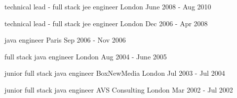 



\begin{cventries}

    \cventry
    {technical lead - full stack jee engineer}
    {}
    {London}
    {June 2008 - Aug 2010}
    {}
    {}

    \cventry
    {technical lead - full stack jee engineer}
    {}
    {London}
    {Dec 2006 - Apr 2008}
    {}
    {}

    \cventry
    {java engineer}
    {}
    {Paris}
    {Sep 2006 - Nov 2006}
    {}
    {}

    \cventry
    {full stack java engineer}
    {}
    {London}
    {Aug 2004 - June 2005}
    {}
    {}

    \cventry
    {junior full stack java engineer}
    {BoxNewMedia}
    {London}
    {Jul 2003 - Jul 2004}
    {}
    {}

    \cventry
    {junior full stack java engineer}
    {AVS Consulting}
    {London}
    {Mar 2002 - Jul 2002} %
    {}
    {}
\end{cventries}
